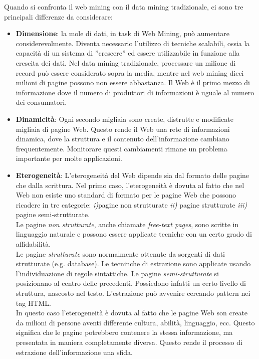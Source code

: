 Quando si confronta il web mining con il data mining tradizionale, ci sono tre principali differenze da considerare:
\begin{itemize}
\item \textbf{Dimensione}: 
la mole di dati, in task di Web Mining, può aumentare considerevolmente. Diventa necessario l'utilizzo di tecniche scalabili, ossia la capacità di un sistema di ''crescere'' ed essere utilizzabile in funzione alla crescita dei dati. Nel data mining tradizionale, processare un milione di record può essere considerato sopra la media, mentre nel web mining dieci milioni di pagine possono non essere abbastanza. Il Web è il primo mezzo di informazione dove il numero di produttori di informazioni è uguale al numero dei consumatori.

\item \textbf{Dinamicità}: 
Ogni secondo migliaia sono create, distrutte e modificate migliaia di pagine Web. Questo rende il Web una rete di informazioni dinamica, dove la struttura e il contenuto dell'informazione cambiano frequentemente. Monitorare questi cambiamenti rimane un problema importante per molte applicazioni.

\item \textbf{Eterogeneità}:
L'eterogeneità del Web dipende sia dal formato delle pagine che dalla scrittura. Nel primo caso, l'eterogeneità è dovuta al fatto che nel Web non esiste uno standard di formato per le pagine Web che possono ricadere in tre categorie: \textit{i)}pagine non strutturate \textit{ii)} pagine strutturate \textit{iii)} pagine semi-strutturate.
\\
Le pagine \textit{non strutturate}, anche chiamate \textit{free-text pages}, sono scritte in linguaggio naturale e possono essere applicate tecniche con un certo grado di affidabilità.
\\
Le pagine \textit{strutturate} sono normalmente ottenute da sorgenti di dati strutturate (e.g. database). Le tecninche di estrazione sono applicate usando l'individuazione di regole sintattiche.
Le pagine \textit{semi-strutturate} si posizionano al centro delle precedenti. Possiedono infatti un certo livello di struttura, nascosto nel testo. L'estrazione può avvenire cercando pattern nei tag HTML.
\\
In questo caso l'eterogeneità è dovuta al fatto che le pagine Web son create da milioni di persone aventi differente cultura, abilità, linguaggio, ecc. Questo significa che le pagine potrebbero contenere la stessa informazione, ma presentata in maniera completamente diversa. Questo rende il processo di estrazione dell'informazione una sfida.


\end{itemize}
